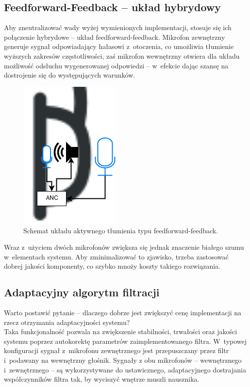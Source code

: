 \subsection{Feedforward-Feedback -- układ hybrydowy}
\label{hybrid}
Aby zneutralizować wady wyżej wymienionych implementacji, stosuje się ich połączenie hybrydowe -- układ feedforward-feedback. Mikrofon zewnętrzny generuje sygnał odpowiadający hałasowi z~otoczenia, co umożliwia tłumienie wyższych zakresów częstotliwości, zaś mikrofon wewnętrzny otwiera dla układu możliwość odsłuchu wygenerowanej odpowiedzi -- w~efekcie dając szansę na dostrojenie się do występujących warunków. 
\begin{figure}[h!]
	\centering
	\includegraphics[scale=0.7]{../Assets/feedforward_feedback.png}
	\caption{Schemat układu aktywnego tłumienia typu feedforward-feedback.}
	\label{fig:feedforward_feedback}
\end{figure}

Wraz z~użyciem dwóch mikrofonów zwiększa się jednak znaczenie białego szumu w~elementach systemu. Aby zminimalizować to zjawisko, trzeba zastosować dobrej jakości komponenty, co szybko mnoży koszty takiego rozwiązania.
\subsection{Adaptacyjny algorytm filtracji}
\label{FIRLMS}
Warto postawić pytanie -- dlaczego dobrze jest zwiększyć cenę implementacji na rzecz otrzymania adaptacyjności systemu?\\
Taka funkcjonalność pozwala na zwiększenie stabilności, trwałości oraz jakości systemu poprzez autokorektę parametrów zaimplementowanego filtra. W~typowej konfiguracji sygnał z~mikrofonu zewnętrznego jest przepuszczany przez filtr i~podawany na wewnętrzny głośnik. Sygnały z obu mikrofonów -- wewnętrznego i~zewnętrznego -- są wykorzystywane do ustawicznego, adaptacyjnego dostrajania współczynników filtra tak, by wyciszyć wnętrze muszli nausznika. 

